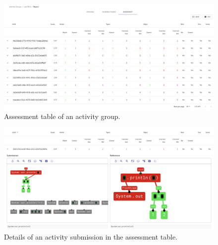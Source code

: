 \begin{chapterBody}
\begin{figure}[ht]
    \centering
    \includegraphics[width=\textwidth]{res/7/sf_assessment_table.png}
    \caption{Assessment table of an activity group.}
    \label{fig:fb-sf-assessment-table}
\end{figure}

\begin{figure}[ht]
    \centering
    \includegraphics[width=\textwidth]{res/7/sf_assessment_individual.png}
    \caption{Details of an activity submission in the assessment table.}
    \label{fig:fb-sf-assessment-details}
\end{figure}

\end{chapterBody}
